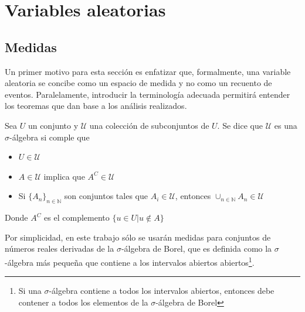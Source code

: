 
\chapter{Variables aleatorias}


\section{Medidas}

Un primer motivo para esta sección es enfatizar que, formalmente, una variable aleatoria se concibe 
como un espacio de medida y no como un recuento de eventos. 
Paralelamente, introducir la terminología adecuada permitirá entender los teoremas que dan base
a los análisis realizados.

\begin{definicion}
Sea $U$ un conjunto y $\mathcal{U}$ una colección de subconjuntos de $U$. Se dice que $\mathcal{U}$
es una $\sigma$-álgebra si comple que
\begin{itemize}
\item $U \in \mathcal{U}$
\item $A \in \mathcal{U}$ implica que $A^{C} \in \mathcal{U}$
\item Si $\{ A_n \}_{n\in \mathbb{N}}$ son conjuntos tales que $A_i \in \mathcal{U}$, entonces
$\displaystyle \cup_{n\in \mathbb{N}} A_n \in \mathcal{U}$
\end{itemize}
Donde $A^{C}$ es el complemento $\{ u \in U | u \notin A \} $
\end{definicion}

Por simplicidad, en este trabajo sólo se usarán medidas para conjuntos de números reales derivadas 
de la $\sigma$-álgebra de Borel, que es definida como la $\sigma$-álgebra más pequeña que contiene a 
los intervalos abiertos abiertos\footnote{Si una $\sigma$-álgebra contiene a todos los
intervalos abiertos, entonces debe contener a todos los elementos de la $\sigma$-álgebra de Borel}.

